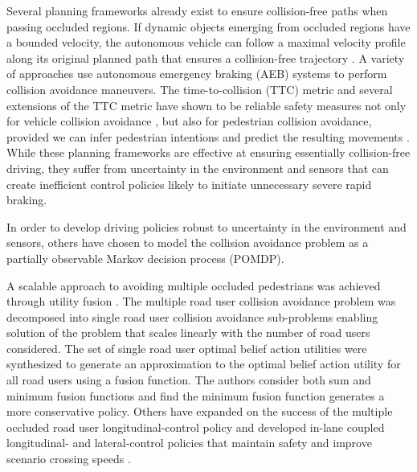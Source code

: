 \documentclass[conference]{IEEEtran}
\begin{document}
Several planning frameworks already exist to ensure collision-free paths when passing occluded regions. If dynamic objects emerging from occluded regions have a bounded velocity, the autonomous vehicle can follow a maximal velocity profile along its original planned path that ensures a collision-free trajectory \cite{Alami2002OnPlans}. A variety of approaches use autonomous emergency braking (AEB) systems to perform collision avoidance maneuvers. The time-to-collision (TTC) metric and several extensions of the TTC metric have shown to be reliable safety measures not only for vehicle collision avoidance \cite{Minderhoud2001ExtendedAssessment}, but also for pedestrian collision avoidance, provided we can infer pedestrian intentions and predict the resulting movements \cite{Volz2019InferringCrosswalks}. While these planning frameworks are effective at ensuring essentially collision-free driving, they suffer from uncertainty in the environment and sensors that can create inefficient control policies likely to initiate unnecessary severe rapid braking.


In order to develop driving policies robust to uncertainty in the environment and sensors, others have chosen to model the collision avoidance problem as a partially observable Markov decision process (POMDP). 

A scalable approach to avoiding multiple occluded pedestrians was achieved through utility fusion \cite{Bouton2018ScalableDriving}. The multiple road user collision avoidance problem was decomposed into single road user collision avoidance sub-problems enabling solution of the problem that scales linearly with the number of road users considered. The set of single road user optimal belief action utilities were synthesized to generate an approximation to the optimal belief action utility for all road users using a fusion function. The authors consider both sum and minimum fusion functions and find the minimum fusion function generates a more conservative policy. Others have expanded on the success of the multiple occluded road user longitudinal-control policy and developed in-lane coupled longitudinal- and lateral-control policies that maintain safety and improve scenario crossing speeds \cite{Schratter2019PedestrianOcclusions}.
\end{document}
